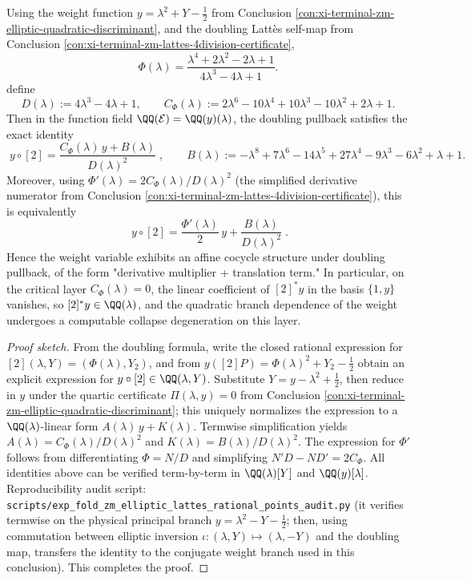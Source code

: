 ﻿%

\begin{conclusion}\label{con:xi-terminal-zm-elliptic-y-doubling-affine-cocycle}
Using the weight function \(y=\lambda^{2}+Y-\tfrac12\) from Conclusion \ref{con:xi-terminal-zm-elliptic-quadratic-discriminant}, and the doubling Latt\`es self-map from Conclusion \ref{con:xi-terminal-zm-lattes-4division-certificate},
\[
\Phi(\lambda)=\frac{\lambda^{4}+2\lambda^{2}-2\lambda+1}{4\lambda^{3}-4\lambda+1}.
\]
define
\[
D(\lambda):=4\lambda^{3}-4\lambda+1,\qquad
C_{\Phi}(\lambda):=2\lambda^{6}-10\lambda^{4}+10\lambda^{3}-10\lambda^{2}+2\lambda+1.
\]
Then in the function field \(\QQ(\mathcal{E})=\QQ(y)(\lambda)\), the doubling pullback satisfies the exact identity
\[
\boxed{\;
y\circ[2]=\frac{C_{\Phi}(\lambda)\,y+B(\lambda)}{D(\lambda)^{2}}\;},
\qquad
B(\lambda):=-\lambda^{8}+7\lambda^{6}-14\lambda^{5}+27\lambda^{4}-9\lambda^{3}-6\lambda^{2}+\lambda+1.
\]
Moreover, using \(\Phi'(\lambda)=2C_{\Phi}(\lambda)/D(\lambda)^{2}\) (the simplified derivative numerator from Conclusion \ref{con:xi-terminal-zm-lattes-4division-certificate}), this is equivalently
\[
\boxed{\;
y\circ[2]=\frac{\Phi'(\lambda)}{2}\,y+\frac{B(\lambda)}{D(\lambda)^{2}}\; }.
\]
Hence the weight variable exhibits an affine cocycle structure under doubling pullback, of the form "derivative multiplier + translation term."
In particular, on the critical layer \(C_{\Phi}(\lambda)=0\), the linear coefficient of \([2]^*y\) in the basis \(\{1,y\}\) vanishes, so \([2]^*y\in\QQ(\lambda)\), and the quadratic branch dependence of the weight undergoes a computable collapse degeneration on this layer.
\end{conclusion}
\begin{proof}[Proof sketch]
From the doubling formula, write the closed rational expression for \([2](\lambda,Y)=(\Phi(\lambda),Y_2)\), and from
\(
y([2]P)=\Phi(\lambda)^{2}+Y_2-\tfrac12
\)
obtain an explicit expression for \(y\circ[2]\in\QQ(\lambda,Y)\).
Substitute \(Y=y-\lambda^{2}+\tfrac12\), then reduce in \(y\) under the quartic certificate \(\Pi(\lambda,y)=0\) from Conclusion \ref{con:xi-terminal-zm-elliptic-quadratic-discriminant}; this uniquely normalizes the expression to a \(\QQ(\lambda)\)-linear form \(A(\lambda)\,y+K(\lambda)\).
Termwise simplification yields \(A(\lambda)=C_{\Phi}(\lambda)/D(\lambda)^{2}\) and \(K(\lambda)=B(\lambda)/D(\lambda)^{2}\).
The expression for \(\Phi'\) follows from differentiating \(\Phi=N/D\) and simplifying \(N'D-ND'=2C_{\Phi}\).
All identities above can be verified term-by-term in \(\QQ(\lambda)[Y]\) and \(\QQ(y)[\lambda]\).
Reproducibility audit script: \texttt{scripts/exp\_fold\_zm\_elliptic\_lattes\_rational\_points\_audit.py} (it verifies termwise on the physical principal branch \(y=\lambda^{2}-Y-\tfrac12\); then, using commutation between elliptic inversion \(\iota:(\lambda,Y)\mapsto(\lambda,-Y)\) and the doubling map, transfers the identity to the conjugate weight branch used in this conclusion). This completes the proof.
\end{proof}

